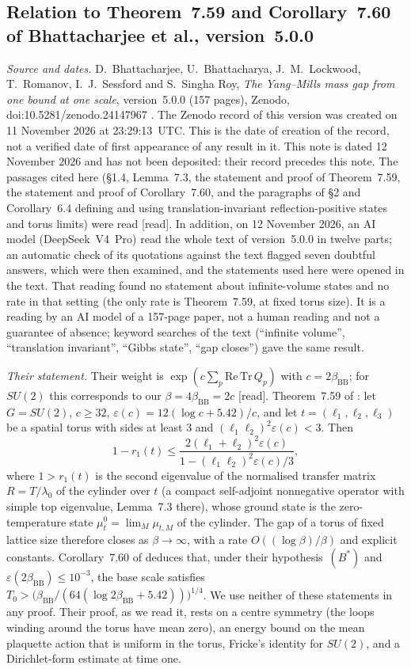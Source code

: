 \documentclass[11pt,a4paper]{article}
\theoremstyle{plain}
\theoremstyle{definition}
\theoremstyle{remark}
\numberwithin{equation}{section}
\newcommand{\st}[1]{\textsf{[#1]}}
\begin{document}
\subsection{Relation to Theorem~7.59 and Corollary~7.60 of Bhattacharjee et al., version~5.0.0}\label{sec:bb26}
\emph{Source and dates.} D.~Bhattacharjee, U.~Bhattacharya, J.~M.~Lockwood, T.~Romanov, I.~J.~Sessford and S.~Singha Roy,
\emph{The Yang--Mills mass gap from one bound at one scale}, version~5.0.0 (157 pages), Zenodo, doi:10.5281/zenodo.24147967 \cite{BB26}.
The Zenodo record of this version was created on 11 November 2026 at 23:29:13~UTC. This is the date of creation of the record, not a verified date of first
appearance of any result in it. This note is dated 12 November 2026 and has not been deposited: their record precedes this note.
The passages cited here (\S1.4, Lemma~7.3, the statement and proof of Theorem~7.59, the statement and proof of
Corollary~7.60, and the paragraphs of \S2 and Corollary~6.4 defining and using translation-invariant reflection-positive states and torus
limits) were read \st{read}. In addition, on 12 November 2026, an AI model (DeepSeek~V4~Pro) read the whole text of version~5.0.0 in twelve parts; an automatic check of its quotations against the text flagged seven doubtful answers, which were then examined, and the statements used here were opened in the text. That reading found no statement about infinite-volume states and no rate in that setting (the only rate is Theorem~7.59, at fixed torus size). It is a reading by an AI model of a 157-page paper, not a human reading and not a guarantee of absence; keyword searches of the text (``infinite volume'', ``translation invariant'', ``Gibbs state'', ``gap closes'') gave the same result.

\emph{Their statement.} Their weight is $\exp(c\sum_p\mathrm{Re}\,\mathrm{Tr}\,Q_p)$ with $c=2\beta_{\mathrm{BB}}$; for $SU(2)$ this corresponds to our
$\beta=4\beta_{\mathrm{BB}}=2c$ \st{read}. Theorem~7.59 of \cite{BB26}: let $G=SU(2)$, $c\ge32$, $\varepsilon(c)=12(\log c+5.42)/c$, and let $t=(\ell_1,\ell_2,\ell_3)$ be a spatial
torus with sides at least $3$ and $(\ell_1\ell_2)^2\varepsilon(c)<3$. Then
\[
1-r_1(t)\le\frac{2(\ell_1+\ell_2)^2\varepsilon(c)}{1-(\ell_1\ell_2)^2\varepsilon(c)/3},
\]
where $1>r_1(t)$ is the second eigenvalue of the normalised transfer matrix $R=T/\lambda_0$ of the cylinder over $t$ (a compact self-adjoint
nonnegative operator with simple top eigenvalue, Lemma~7.3 there), whose ground state is the zero-temperature state $\mu^0_t=\lim_M\mu_{t,M}$ of the cylinder.
The gap of a torus of fixed lattice size therefore closes as $\beta\to\infty$, with a rate $O((\log\beta)/\beta)$ and explicit constants.
Corollary~7.60 of \cite{BB26} deduces that, under their hypothesis~$(B^*)$ and $\varepsilon(2\beta_{\mathrm{BB}})\le10^{-3}$, the base scale satisfies
$T_0>\bigl(\beta_{\mathrm{BB}}/(64(\log2\beta_{\mathrm{BB}}+5.42))\bigr)^{1/4}$. We use neither of these statements in any proof. Their proof, as we read it, rests on a
centre symmetry (the loops winding around the torus have mean zero), an energy bound on the mean plaquette action that is uniform in the torus,
Fricke's identity for $SU(2)$, and a Dirichlet-form estimate at time one.
\end{document}

